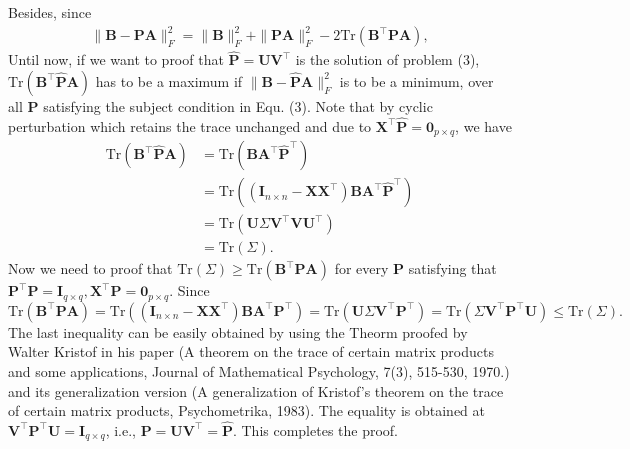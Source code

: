 \documentclass[titlepage,11pt,twoside]{article}
\begin{document}
Besides, since
\begin{equation}
\begin{split}
\|\mathbf{B}-\mathbf{P}\mathbf{A}\|_{F}^{2}
=\|\mathbf{B}\|_{F}^{2}+\|\mathbf{P}\mathbf{A}\|_{F}^{2}-2\text{Tr}(\mathbf{B}^{\top}\mathbf{P}\mathbf{A}),
\end{split}
\end{equation}
Until now, if we want to proof that $\mathbf{\hat{P}}=\mathbf{U}\mathbf{V}^{\top}$ is the solution of problem (3), $\text{Tr}(\mathbf{B}^{\top}\mathbf{\hat{P}}\mathbf{A})$ has to be a maximum if $\|\mathbf{B}-\mathbf{\hat{P}}\mathbf{A}\|_{F}^{2}$ is to be a minimum, over all $\mathbf{P}$ satisfying the subject condition in Equ. (3).
Note that by cyclic perturbation which retains the trace unchanged and due to $\mathbf{X}^{\top}\mathbf{\hat{P}}=\mathbf{0}_{p\times q}$, we have 
\begin{equation}
\begin{split}
\text{Tr}(\mathbf{B}^{\top}\mathbf{\hat{P}}\mathbf{A})
&
=
\text{Tr}(\mathbf{B}\mathbf{A}^{\top}\mathbf{\hat{P}}^{\top})
\\
&
=
\text{Tr}((\mathbf{I}_{n\times n}-\mathbf{X}\mathbf{X}^{\top})\mathbf{B}\mathbf{A}^{\top}\mathbf{\hat{P}}^{\top})
\\
&
=
\text{Tr}(\mathbf{U}\Sigma\mathbf{V}^{\top}\mathbf{V}\mathbf{U}^{\top})
\\
&
=
\text{Tr}(\Sigma).
\end{split}
\end{equation}
Now we need to proof that $\text{Tr}(\Sigma)\ge\text{Tr}(\mathbf{B}^{\top}\mathbf{P}\mathbf{A})$ for every $\mathbf{P}$ satisfying that $\mathbf{P}^{\top}\mathbf{P} = \mathbf{I}_{q\times q}, \mathbf{X}^{\top}\mathbf{P} = \mathbf{0}_{p\times q}$. 
Since $\text{Tr}(\mathbf{B}^{\top}\mathbf{P}\mathbf{A})
=
\text{Tr}((\mathbf{I}_{n\times n}-\mathbf{X}\mathbf{X}^{\top})\mathbf{B}\mathbf{A}^{\top}\mathbf{P}^{\top})
=
\text{Tr}(\mathbf{U}\Sigma\mathbf{V}^{\top}\mathbf{P}^{\top})
=
\text{Tr}(\Sigma\mathbf{V}^{\top}\mathbf{P}^{\top}\mathbf{U})
\le
\text{Tr}(\Sigma)
.
$
The last inequality can be easily obtained by using the Theorm proofed by Walter Kristof in his paper (A theorem on the trace of certain matrix products and some applications, Journal of Mathematical Psychology, 7(3), 515-530, 1970.) and its generalization version (A generalization of Kristof's theorem on the trace of certain matrix products, Psychometrika, 1983). The equality is obtained at 
$\mathbf{V}^{\top}\mathbf{P}^{\top}\mathbf{U}=\mathbf{I}_{q\times q}$, i.e., $\mathbf{P}=\mathbf{U}\mathbf{V}^{\top}=\mathbf{\hat{P}}$. This completes the proof.
\end{document}
